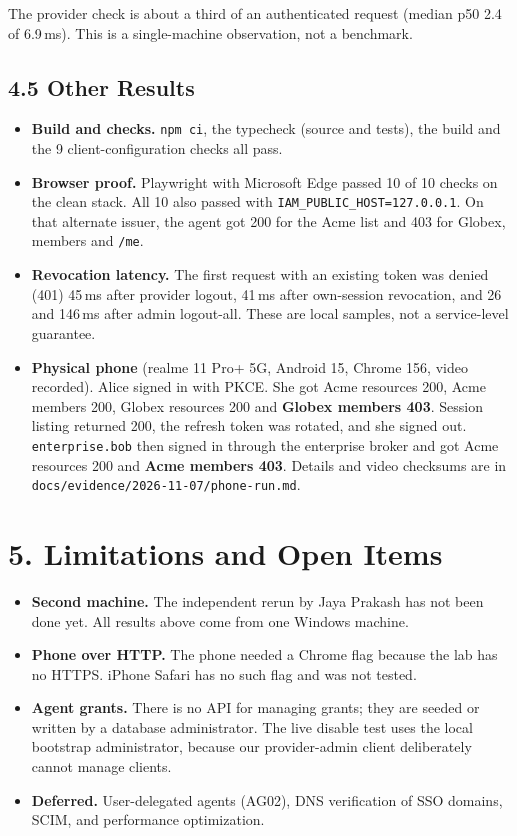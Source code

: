 \documentclass{article}
\begin{document}
The provider check is about a third of an authenticated request (median p50 2.4 of 6.9\,ms). This is a single-machine observation, not a benchmark.

\subsection*{4.5 Other Results}
\begin{itemize}
    \item \textbf{Build and checks.} \texttt{npm ci}, the typecheck (source and tests), the build and the 9 client-configuration checks all pass.
    \item \textbf{Browser proof.} Playwright with Microsoft Edge passed 10 of 10 checks on the clean stack. All 10 also passed with \texttt{IAM\_PUBLIC\_HOST=127.0.0.1}. On that alternate issuer, the agent got 200 for the Acme list and 403 for Globex, members and \texttt{/me}.
    \item \textbf{Revocation latency.} The first request with an existing token was denied (401) 45\,ms after provider logout, 41\,ms after own-session revocation, and 26 and 146\,ms after admin logout-all. These are local samples, not a service-level guarantee.
    \item \textbf{Physical phone} (realme 11 Pro+ 5G, Android 15, Chrome 156, video recorded). Alice signed in with PKCE. She got Acme resources 200, Acme members 200, Globex resources 200 and \textbf{Globex members 403}. Session listing returned 200, the refresh token was rotated, and she signed out. \texttt{enterprise.bob} then signed in through the enterprise broker and got Acme resources 200 and \textbf{Acme members 403}. Details and video checksums are in \texttt{docs/evidence/2026-11-07/phone-run.md}.
\end{itemize}

\section*{5. Limitations and Open Items}
\begin{itemize}
    \item \textbf{Second machine.} The independent rerun by Jaya Prakash has not been done yet. All results above come from one Windows machine.
    \item \textbf{Phone over HTTP.} The phone needed a Chrome flag because the lab has no HTTPS. iPhone Safari has no such flag and was not tested.
    \item \textbf{Agent grants.} There is no API for managing grants; they are seeded or written by a database administrator. The live disable test uses the local bootstrap administrator, because our provider-admin client deliberately cannot manage clients.
    \item \textbf{Deferred.} User-delegated agents (AG02), DNS verification of SSO domains, SCIM, and performance optimization.
\end{itemize}
\end{document}
